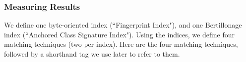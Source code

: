 










\subsubsection{Measuring Results}

We define one byte-oriented index (``Fingerprint Index"), and one
Bertillonage index (``Anchored Class Signature Index").  Using the indices,
we define four matching techniques (two per index).  Here are the four
matching techniques, followed by a shorthand tag we use later to refer to
them.

